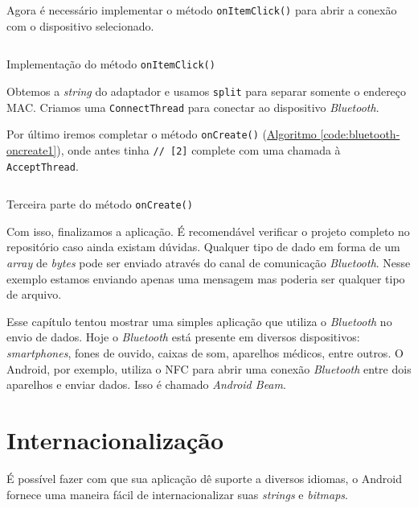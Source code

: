 \documentclass[a4paper,12pt,brazil,oneside]{book}
\begin{document}
	Agora é necessário implementar o método \texttt{onItemClick()} para abrir a conexão com o dispositivo selecionado.

	\begin{listing}[H]
	\inputminted[linenos=true,fontsize=\small,frame=lines, framesep=2mm, tabsize=2,numbersep=5pt]{java}{src/api/bluetooth/onitemclick.java}
	\caption{Implementação do método \texttt{onItemClick()}}
	\label{code:bluetooth-onitemclick}
	\end{listing} 	

	Obtemos a \emph{string} do adaptador e usamos \texttt{split} para separar somente o endereço MAC. Criamos uma \texttt{ConnectThread} para conectar ao dispositivo \emph{Bluetooth}.

	Por último iremos completar o método \texttt{onCreate()} (\hyperref[code:bluetooth-oncreate1]{Algoritmo \ref*{code:bluetooth-oncreate1}}), onde antes tinha \texttt{// [2]} complete com uma chamada à \texttt{AcceptThread}. 

	\begin{listing}[H]
	\inputminted[linenos=true,fontsize=\small,frame=lines, framesep=2mm, tabsize=2,numbersep=5pt]{java}{src/api/bluetooth/oncreate3.java}
	\caption{Terceira parte do método \texttt{onCreate()}}
	\label{code:bluetooth-oncreate3}
	\end{listing} 	

	Com isso, finalizamos a aplicação. É recomendável verificar o projeto completo no repositório caso ainda existam dúvidas. Qualquer tipo de dado em forma de um \emph{array} de \emph{bytes} pode ser enviado através do canal de comunicação \emph{Bluetooth}. Nesse exemplo estamos enviando apenas uma mensagem mas poderia ser qualquer tipo de arquivo.

	Esse capítulo tentou mostrar uma simples aplicação que utiliza o \emph{Bluetooth} no envio de dados. Hoje o \emph{Bluetooth} está presente em diversos dispositivos: \emph{smartphones}, fones de ouvido, caixas de som, aparelhos médicos, entre outros. O Android, por exemplo, utiliza o NFC para abrir uma conexão \emph{Bluetooth} entre dois aparelhos e enviar dados. Isso é chamado \emph{Android Beam}. 

\chapter{Internacionalização}

	É possível fazer com que sua aplicação dê suporte a diversos idiomas, o Android fornece uma maneira fácil de internacionalizar suas \emph{strings} e \emph{bitmaps}. 
\end{document}
